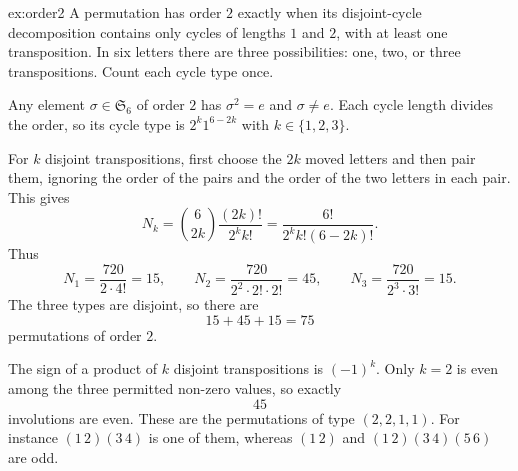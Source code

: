 \begin{solution}{ex:order2}
\idea A permutation has order $2$ exactly when its disjoint-cycle decomposition contains only cycles of lengths $1$ and $2$, with at least one transposition. In six letters there are three possibilities: one, two, or three transpositions. Count each cycle type once.

\writeup Any element $\sigma\in\mathfrak S_6$ of order $2$ has $\sigma^2=e$ and $\sigma\ne e$. Each cycle length divides the order, so its cycle type is $2^k1^{6-2k}$ with $k\in\{1,2,3\}$.

For $k$ disjoint transpositions, first choose the $2k$ moved letters and then pair them, ignoring the order of the pairs and the order of the two letters in each pair. This gives
\[
N_k=\binom6{2k}\frac{(2k)!}{2^k k!}
=\frac{6!}{2^k k!(6-2k)!}.
\]
Thus
\[
N_1=\frac{720}{2\cdot4!}=15,\qquad
N_2=\frac{720}{2^2\cdot2!\cdot2!}=45,\qquad
N_3=\frac{720}{2^3\cdot3!}=15.
\]
The three types are disjoint, so there are
\[
\boxed{15+45+15=75}
\]
permutations of order $2$.

The sign of a product of $k$ disjoint transpositions is $(-1)^k$. Only $k=2$ is even among the three permitted non-zero values, so exactly
\[
\boxed{45}
\]
involutions are even. These are the permutations of type $(2,2,1,1)$. For instance $(1\,2)(3\,4)$ is one of them, whereas $(1\,2)$ and $(1\,2)(3\,4)(5\,6)$ are odd.
\end{solution}

